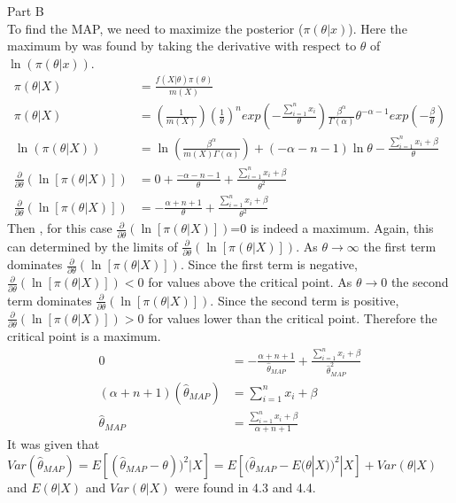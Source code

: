 \documentclass[11pt]{article}
\begin{document}
\vspace{5mm}
Part B \\
To find the MAP, we need to maximize the posterior ($\pi(\theta|x)$). Here the maximum by was found by taking the derivative with respect to $\theta$ of $\ln (\pi(\theta|x))$.  
\begin{align*}
\pi(\theta|X) &=\frac{ f(X| \theta) \pi (\theta)}{m(X)} \\
\pi(\theta|X) &=\left(\frac{1}{m(X)} \right) \left(\frac{1}{\theta} \right)^n exp\left(-\frac{\sum \limits_{i=1}^n x_i}{\theta} \right) \frac{\beta^\alpha}{\Gamma(\alpha)}\theta^{-\alpha-1} exp\left(-\frac{\beta}{\theta}\right) \\
\ln (\pi(\theta|X)) &= \ln \left(\frac{\beta^\alpha}{m(X) \Gamma(\alpha)} \right) +(-\alpha-n-1) \ln \theta -\frac{\sum_{i=1}^{n} x_i+\beta}{\theta} \\
\frac{\partial}{\partial \theta} \left( \ln [\pi(\theta|X)] \right) &= 0+\frac{-\alpha-n-1}{\theta}+\frac{\sum_{i=1}^{n} x_i+\beta}{\theta^2} \\
\frac{\partial}{\partial \theta} \left( \ln [\pi(\theta|X)] \right) &=-\frac{\alpha+n+1}{\theta}+\frac{\sum_{i=1}^{n} x_i+\beta}{\theta^2}
\end{align*}
Then , for this case $\frac{\partial}{\partial \theta} \left( \ln [\pi(\theta|X)] \right)$=0 is indeed a maximum.  Again, this can determined by the limits of $\frac{\partial}{\partial \theta} \left( \ln [\pi(\theta|X)] \right)$.  As $\theta \to \infty$ the first term dominates $\frac{\partial}{\partial \theta} \left( \ln [\pi(\theta|X)] \right)$.  Since the first term is negative, $\frac{\partial}{\partial \theta} \left( \ln [\pi(\theta|X)] \right)<0$ for values above the critical point.  As $\theta \to 0$ the second term dominates $\frac{\partial}{\partial \theta} \left( \ln [\pi(\theta|X)] \right)$.  Since the second term is positive, $\frac{\partial}{\partial \theta} \left( \ln [\pi(\theta|X)] \right)>0$ for values lower than the critical point. Therefore the critical point is a maximum.  
\begin{align*}
0 &=-\frac{\alpha+n+1}{\hat{\theta}_{MAP}}+\frac{\sum_{i=1}^{n} x_i+\beta}{\hat{\theta}_{MAP}^2} \\
(\alpha+n+1)(\hat{\theta}_{MAP}) &=\sum_{i=1}^{n} x_i+\beta \\
\hat{\theta}_{MAP} &= \frac{\sum_{i=1}^{n} x_i+\beta}{\alpha+n+1} 
\end{align*}
It was given that $Var(\hat{\theta}_{MAP})=E[(\hat{\theta}_{MAP}-\theta))^2|X]=E[(\hat{\theta}_{MAP}-E(\theta|X))^2|X]+Var(\theta|X)$ and $E(\theta|X)$ and $Var(\theta|X)$ were found in 4.3 and 4.4. 
\end{document}
